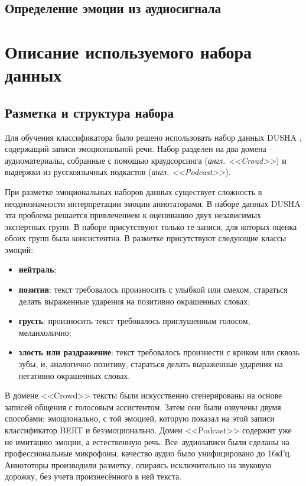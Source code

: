 \subsection{Определение эмоции из аудиосигнала}
\section{Описание используемого набора данных}
\subsection{Разметка и структура набора}
Для обучения классификатора было решено использовать набор данных DUSHA \cite{dusha}, содержащий записи эмоциональной речи. Набор разделен на два домена -- аудиоматериалы, собранные с помощью краудсорсинга (\textit{англ. <<Croud>>}) и выдержки из русскоязычных подкастов (\textit{англ. <<Podcast>>}). 

При разметке эмоциональных наборов данных существует сложность в неоднозначности интерпретации эмоции аннотаторами. В наборе данных DUSHA эта проблема решается привлечением к оцениванию двух независимых экспертных групп. В наборе присутствуют только те записи, для которых оценка обоих групп была консистентна. В разметке присутствуют следующие классы эмоций: 
\begin{itemize}
	\item \textbf{нейтраль};
	\item \textbf{позитив}: текст требовалось произносить с улыбкой или смехом, стараться делать выраженные ударения на позитивно окрашенных словах;
	\item \textbf{грусть}: произносить текст требовалось приглушенным голосом, меланхолично;
	\item \textbf{злость или раздражение}: текст требовалось произнести с криком или сквозь зубы, и, аналогично позитиву, стараться делать выраженные ударения на негативно окрашенных словах.
\end{itemize}

В домене <<Crowd>> тексты были искусственно сгенерированы на основе записей общения с голосовым ассистентом. Затем они были озвучены двумя способами: эмоционально, с той эмоцией, которую показал на этой записи классификатор BERT \cite{bert} и безэмоционально. Домен <<Podcast>> содержит уже не имитацию эмоции, а естественную речь. Все аудиозаписи были сделаны на профессиональные микрофоны, качество аудио было унифицировано до 16кГц. Аннототоры производили разметку, опираясь исключительно на звуковую дорожку, без учета произнесённого в ней текста.
